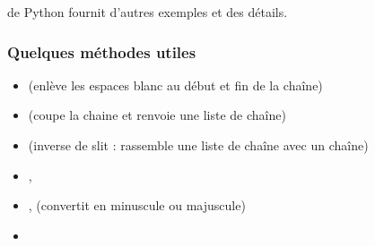 \documentclass[letterpaper,10pt,english]{sphinxhowto}
\begin{document}
\sphinxAtStartPar
{} de Python fournit d’autres exemples et des détails.


\subsubsection{Quelques méthodes utiles}
\label{\detokenize{cours4_chaine_caractere_cours:quelques-methodes-utiles}}\begin{itemize}
\item {} 
\sphinxAtStartPar
{} (enlève les espaces blanc au début et fin de la chaîne)

\item {} 
\sphinxAtStartPar
{} (coupe la chaine et renvoie une liste de chaîne)

\item {} 
\sphinxAtStartPar
{} (inverse de slit : rassemble une liste de chaîne avec un chaîne)

\item {} 
\sphinxAtStartPar
{}, 

\item {} 
\sphinxAtStartPar
{},  (convertit en minuscule ou majuscule)

\item {} 
\sphinxAtStartPar
{}

\end{itemize}

\begin{sphinxVerbatim}[commandchars=\\\{\}]


  \PYG{p}{[}   \PYG{p}{]}
  
\end{sphinxVerbatim}
\end{document}
